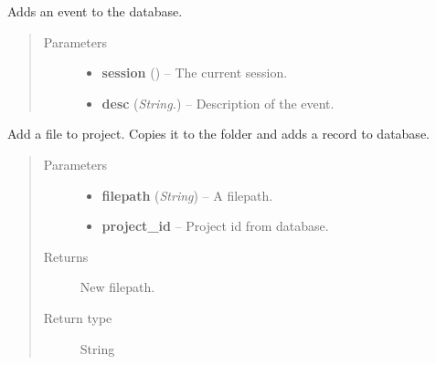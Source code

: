 \documentclass[letterpaper,10pt,english]{sphinxmanual}
\begin{document}
\begin{fulllineitems}
\label{controller:controller.AddEvent}
Adds an event to the database.
\begin{quote}\begin{description}
\item[{Parameters}] \leavevmode\begin{itemize}
\item {} 
\textbf{session} ({\hyperref[models:models.Session]{}}) -- The current session.

\item {} 
\textbf{desc} (\emph{String.}) -- Description of the event.

\end{itemize}

\end{description}\end{quote}

\end{fulllineitems}


\begin{fulllineitems}
\label{controller:controller.AddFileToProject}
Add a file to project. Copies it to the folder and adds a record to
database.
\begin{quote}\begin{description}
\item[{Parameters}] \leavevmode\begin{itemize}
\item {} 
\textbf{filepath} (\emph{String}) -- A filepath.

\item {} 
\textbf{project\_id} -- Project id from database.

\end{itemize}

\item[{Returns}] \leavevmode
New filepath.

\item[{Return type}] \leavevmode
String

\end{description}\end{quote}

\end{fulllineitems}
\end{document}
